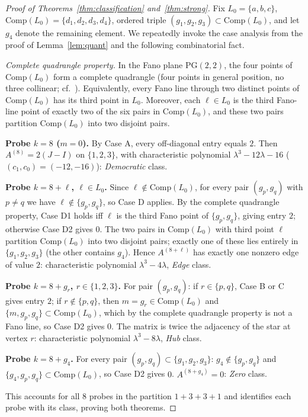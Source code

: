 \documentclass[12pt,a4paper]{article}
\begin{document}
\begin{proof}[Proof of Theorems~\ref{thm:classification} and~\ref{thm:strong}]
Fix $L_0 = \{a,b,c\}$, $\mathrm{Comp}(L_0) = \{d_1, d_2, d_3, d_4\}$, ordered triple $(g_1, g_2, g_3) \subset \mathrm{Comp}(L_0)$, and let $g_4$ denote the remaining element. We repeatedly invoke the case analysis from the proof of Lemma~\ref{lem:quant} and the following combinatorial fact.

\emph{Complete quadrangle property.} In the Fano plane $\mathrm{PG}(2{,}2)$, the four points of $\mathrm{Comp}(L_0)$ form a complete quadrangle (four points in general position, no three collinear; cf.~\cite[\S~2]{hartshorne1967}). Equivalently, every Fano line through two distinct points of $\mathrm{Comp}(L_0)$ has its third point in $L_0$. Moreover, each $\ell \in L_0$ is the third Fano-line point of exactly two of the six pairs in $\mathrm{Comp}(L_0)$, and these two pairs partition $\mathrm{Comp}(L_0)$ into two disjoint pairs.

\textbf{Probe $k = 8$ ($m = 0$).} By Case A, every off-diagonal entry equals $2$. Then $A^{(8)} = 2(J - I)$ on $\{1,2,3\}$, with characteristic polynomial $\lambda^3 - 12\lambda - 16$ ($(c_1, c_0) = (-12, -16)$): \emph{Democratic} class.

\textbf{Probe $k = 8 + \ell$, $\ell \in L_0$.} Since $\ell \notin \mathrm{Comp}(L_0)$, for every pair $(g_p, g_q)$ with $p \neq q$ we have $\ell \notin \{g_p, g_q\}$, so Case D applies. By the complete quadrangle property, Case D1 holds iff $\ell$ is the third Fano point of $\{g_p, g_q\}$, giving entry $2$; otherwise Case D2 gives $0$. The two pairs in $\mathrm{Comp}(L_0)$ with third point $\ell$ partition $\mathrm{Comp}(L_0)$ into two disjoint pairs; exactly one of these lies entirely in $\{g_1, g_2, g_3\}$ (the other contains $g_4$). Hence $A^{(8+\ell)}$ has exactly one nonzero edge of value $2$: characteristic polynomial $\lambda^3 - 4\lambda$, \emph{Edge} class.

\textbf{Probe $k = 8 + g_r$, $r \in \{1,2,3\}$.} For pair $(g_p, g_q)$: if $r \in \{p, q\}$, Case B or C gives entry $2$; if $r \notin \{p, q\}$, then $m = g_r \in \mathrm{Comp}(L_0)$ and $\{m, g_p, g_q\} \subset \mathrm{Comp}(L_0)$, which by the complete quadrangle property is not a Fano line, so Case D2 gives $0$. The matrix is twice the adjacency of the star at vertex $r$: characteristic polynomial $\lambda^3 - 8\lambda$, \emph{Hub} class.

\textbf{Probe $k = 8 + g_4$.} For every pair $(g_p, g_q) \subset \{g_1, g_2, g_3\}$: $g_4 \notin \{g_p, g_q\}$ and $\{g_4, g_p, g_q\} \subset \mathrm{Comp}(L_0)$, so Case D2 gives $0$. $A^{(8+g_4)} = 0$: \emph{Zero} class.

This accounts for all $8$ probes in the partition $1 + 3 + 3 + 1$ and identifies each probe with its class, proving both theorems.
\end{proof}
\end{document}
